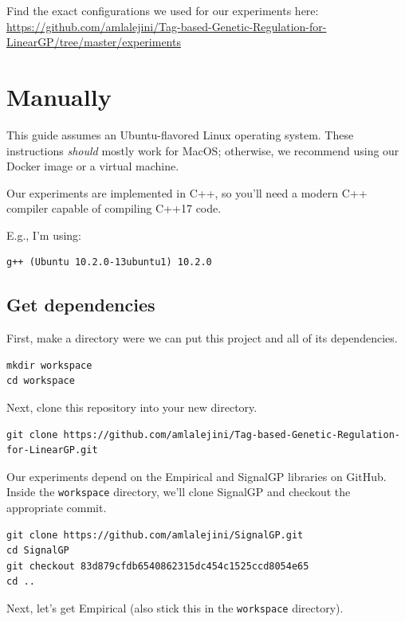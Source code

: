 \documentclass[
]{book}
\begin{document}
Find the exact configurations we used for our experiments here: \url{https://github.com/amlalejini/Tag-based-Genetic-Regulation-for-LinearGP/tree/master/experiments}

\hypertarget{manually}{%
\section{Manually}\label{manually}}

This guide assumes an Ubuntu-flavored Linux operating system. These instructions \emph{should} mostly work for MacOS; otherwise, we recommend using our Docker image or a virtual machine.

Our experiments are implemented in C++, so you'll need a modern C++ compiler capable of compiling C++17 code.

E.g., I'm using:

\begin{verbatim}
g++ (Ubuntu 10.2.0-13ubuntu1) 10.2.0
\end{verbatim}

\hypertarget{get-dependencies}{%
\subsection{Get dependencies}\label{get-dependencies}}

First, make a directory were we can put this project and all of its dependencies.

\begin{verbatim}
mkdir workspace
cd workspace
\end{verbatim}

Next, clone this repository into your new directory.

\begin{verbatim}
git clone https://github.com/amlalejini/Tag-based-Genetic-Regulation-for-LinearGP.git
\end{verbatim}

Our experiments depend on the Empirical and SignalGP libraries on GitHub.
Inside the \texttt{workspace} directory, we'll clone SignalGP and checkout the appropriate commit.

\begin{verbatim}
git clone https://github.com/amlalejini/SignalGP.git
cd SignalGP
git checkout 83d879cfdb6540862315dc454c1525ccd8054e65
cd ..
\end{verbatim}

Next, let's get Empirical (also stick this in the \texttt{workspace} directory).
\end{document}
